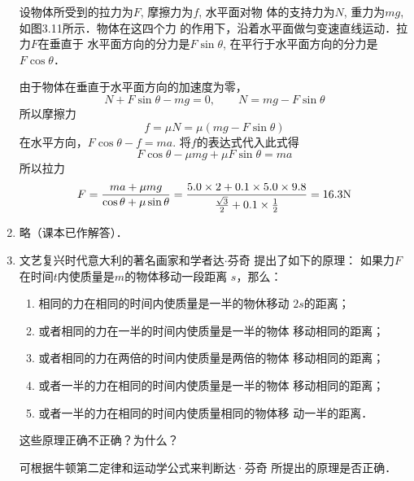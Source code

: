 \begin{enumerate}
\begin{figure}[htp]
\begin{tikzpicture}[>=latex]
\end{tikzpicture}
    \caption{}
\end{figure}

\begin{solution}
设物体所受到的拉力为$F$, 摩擦力为$f$, 水平面对物
体的支持力为$N$, 重力为$mg$, 如图3.11所示．物体在这四个力
的作用下，沿着水平面做匀变速直线运动．拉力$F$在垂直于
水平面方向的分力是$F\sin\theta$,
在平行于水平面方向的分力是$F\cos\theta$．

由于物体在垂直于水平面方向的加速度为零，
\[N+F\sin\theta-mg=0,\qquad  N=mg-F\sin\theta\]
所以摩擦力
\[f=\mu N=\mu (mg-F\sin\theta)\]
在水平方向，$F\cos\theta-f=ma$. 将$f$的表达式代入此式得
\[F\cos\theta-\mu mg+\mu F\sin\theta=ma\]
所以拉力
\[F=\frac{ma+\mu mg}{\cos\theta+\mu \sin\theta}=\frac{5.0\x 2+0.1\x 5.0\x 9.8}{\frac{\sqrt{3}}{2}+0.1\x \frac{1}{2}}=16.3{\rm N}\]
\end{solution}
\item  略（课本已作解答）．

\item    文艺复兴时代意大利的著名画家和学者达$\cdot$芬奇
提出了如下的原理：
    如果力$F$在时间$t$内使质量是$m$的物体移动一段距离
$s$，那么：
\begin{enumerate}
    \item  相同的力在相同的时间内使质量是一半的物休移动
    $2s$的距离；
\item  或者相同的力在一半的时间内使质量是一半的物体
移动相同的距离；
\item  或者相同的力在两倍的时间内使质量是两倍的物体
移动相同的距离；
\item  或者一半的力在相同的时间内使质量是一半的物体
移动相同的距离；
\item  或者一半的力在相同的时间内使质量相同的物体移
动一半的距离．
\end{enumerate}
    这些原理正确不正确？为什么？

    \begin{solution}
可根据牛顿第二定律和运动学公式来判断达·芬奇
所提出的原理是否正确．


\end{solution}
\end{enumerate}
